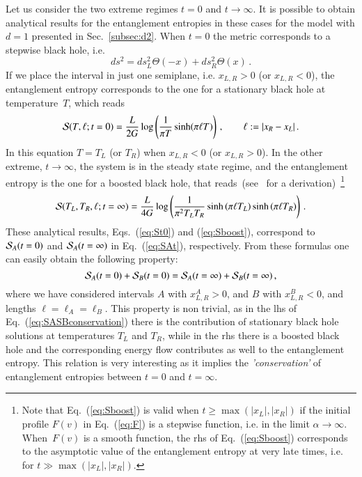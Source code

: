 \documentclass[epj]{webofc}
\begin{document}
Let us consider the two extreme regimes $t=0$ and $t \to \infty$. It is possible to obtain analytical results for the entanglement entropies in these cases for the model with $d=1$ presented in Sec.~\ref{subsec:d2}. When $t=0$ the metric corresponds to a stepwise black hole, i.e.
\begin{equation}
ds^2 = ds_L^2 \Theta(-x) + ds_R^2 \Theta(x) \,.
\end{equation}
If we place the interval in just one semiplane, i.e. $x_{L,R} > 0$ (or $x_{L,R} < 0$), the entanglement entropy corresponds to the one for a stationary black hole at temperature~$T$, which reads
\begin{equation}
{\cal S}(T,\ell;t=0) = \frac{L}{2G} \log \left( \frac{1}{\pi T}  \sinh( \pi \ell T) \right) \,, \qquad \ell := |x_R - x_L| \,.  \label{eq:St0}
\end{equation}
In this equation $T=T_{L}$ (or $T_R$) when $x_{L,R}<0$ (or $x_{L,R}>0$).  In the other extreme, $t \to \infty$, the system is in the steady state regime, and the entanglement entropy is the one for a boosted black hole, that reads~(see~\cite{workinprogress} for a derivation)~\footnote{Note that Eq.~(\ref{eq:Sboost}) is valid when $t \ge \max(|x_L|,|x_R|)$ if the initial profile $F(v)$ in Eq.~(\ref{eq:F}) is a stepwise function, i.e. in the limit $\alpha \to \infty$. When~$F(v)$ is a smooth function, the rhs of Eq.~(\ref{eq:Sboost}) corresponds to the asymptotic value of the entanglement entropy at very late times, i.e. for $t \gg \max(|x_L|,|x_R|)$.}
\begin{equation}
{\cal S}(T_L,T_R,\ell;t=\infty) =  \frac{L}{4G} \log \left( \frac{1}{\pi^2 T_L T_R} \sinh\left( \pi \ell T_L \right)  \sinh\left( \pi \ell  T_R \right) \right) \,. \label{eq:Sboost}
\end{equation}
These analytical results, Eqs.~(\ref{eq:St0}) and (\ref{eq:Sboost}), correspond to ${\cal S}_A(t=0)$ and ${\cal S}_A(t=\infty)$ in Eq.~(\ref{eq:SAt}), respectively. From these formulas one can easily obtain the following property:
\begin{equation}
{\cal S}_A(t=0) + {\cal S}_B(t=0) = {\cal S}_A(t=\infty) + {\cal S}_B(t=\infty) \,, \label{eq:SASBconservation}
\end{equation}
where we have considered intervals $A$ with $x^A_{L,R}>0$, and $B$ with $x^B_{L,R}<0$, and lengths $\ell = \ell_A = \ell_B$. This property is non trivial, as in the lhs of Eq.~(\ref{eq:SASBconservation}) there is the contribution of stationary black hole solutions at temperatures $T_L$ and $T_R$, while in the rhs there is a boosted black hole and the corresponding energy flow contributes as well to the entanglement entropy. This relation is very interesting as it implies the {\it 'conservation'} of entanglement entropies between $t=0$ and $t=\infty$. 
\end{document}
